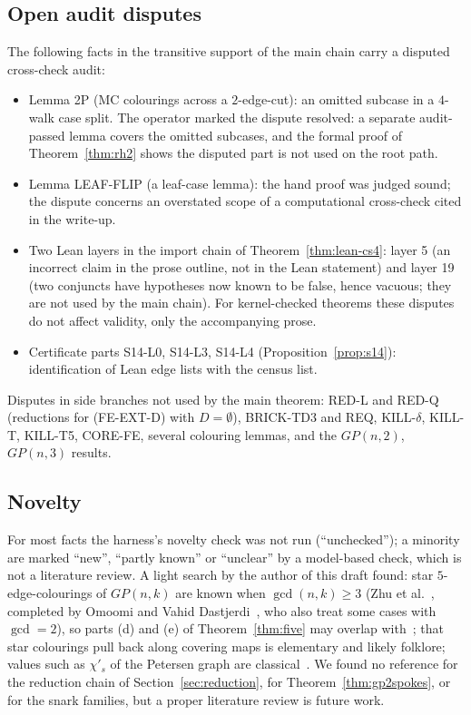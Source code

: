 \documentclass[11pt]{amsart}
\theoremstyle{definition}
\theoremstyle{remark}
\newcommand{\chis}{\chi'_{s}}
\newcommand{\hyp}[1]{\textup{(#1)}}
\newcommand{\Lean}{\textsf{Lean}}
\begin{document}
\subsection{Open audit disputes}
The following facts in the transitive support of the main chain carry a disputed cross-check audit:
\begin{itemize}
\item Lemma 2P (MC colourings across a $2$-edge-cut): an omitted subcase in a $4$-walk case split. The operator marked the dispute resolved: a separate audit-passed lemma covers the omitted subcases, and the formal proof of Theorem~\ref{thm:rh2} shows the disputed part is not used on the root path.
\item Lemma LEAF-FLIP (a leaf-case lemma): the hand proof was judged sound; the dispute concerns an overstated scope of a computational cross-check cited in the write-up.
\item Two \Lean{} layers in the import chain of Theorem~\ref{thm:lean-cs4}: layer 5 (an incorrect claim in the prose outline, not in the \Lean{} statement) and layer 19 (two conjuncts have hypotheses now known to be false, hence vacuous; they are not used by the main chain). For kernel-checked theorems these disputes do not affect validity, only the accompanying prose.
\item Certificate parts S14-L0, S14-L3, S14-L4 (Proposition~\ref{prop:s14}): identification of \Lean{} edge lists with the census list.
\end{itemize}
Disputes in side branches not used by the main theorem: RED-L and RED-Q (reductions for \hyp{FE-EXT-D} with $D=\emptyset$), BRICK-TD3 and REQ, KILL-$\delta$, KILL-T, KILL-T5, CORE-FE, several colouring lemmas, and the $GP(n,2)$, $GP(n,3)$ results.

\subsection{Novelty}\label{sec:novelty}
For most facts the harness's novelty check was not run (``unchecked''); a minority are marked ``new'', ``partly known'' or ``unclear'' by a model-based check, which is not a literature review. A light search by the author of this draft found:
star $5$-edge-colourings of $GP(n,k)$ are known when $\gcd(n,k)\ge 3$ (Zhu et al.~\cite{Zhu21}, completed by Omoomi and Vahid Dastjerdi~\cite{OD24}, who also treat some cases with $\gcd=2$), so parts (d) and (e) of Theorem~\ref{thm:five} may overlap with~\cite{OD24}; that star colourings pull back along covering maps is elementary and likely folklore; values such as $\chis$ of the Petersen graph are classical~\cite{DMS13}. We found no reference for the reduction chain of Section~\ref{sec:reduction}, for Theorem~\ref{thm:gp2spokes}, or for the snark families, but a proper literature review is future work.
\end{document}
